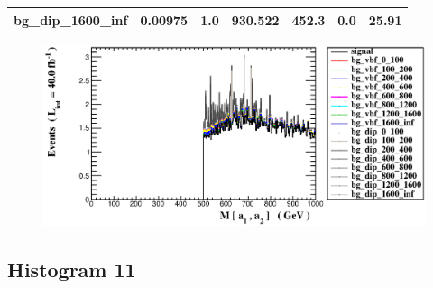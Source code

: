 \documentclass[a4paper, 10pt]{article}
\begin{document}
\begin{table}[H]
\begin{center}
\begin{tabular}{|m{23.0mm}|m{23.0mm}|m{18.0mm}|m{19.0mm}|m{19.0mm}|m{19.0mm}|m{19.0mm}|}
      \hline
      {\cellcolor{white}         bg\_dip\_1600\_inf}& {\cellcolor{white}         0.00975}& {\cellcolor{white}         1.0}& {\cellcolor{white}         930.522}& {\cellcolor{white}         452.3}& {\cellcolor{red}         0.0}& {\cellcolor{red}         25.91}\\
\hline
    \end{tabular}
  \end{center}
\end{table}

\begin{figure}[H]
  \begin{center}
    \includegraphics[scale=0.45]{selection_9.eps}\\
\caption{   }
  \end{center}
\end{figure}
      \newpage
\subsection{ Histogram 11}
\end{document}
